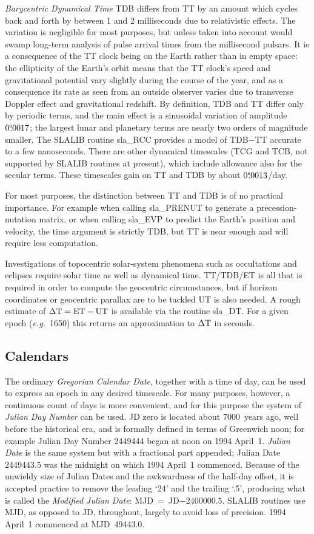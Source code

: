 \documentclass[11pt,twoside]{article}
\newcommand{\tseci}[1]   {$#1$\mbox{$^{\rm s}$}}
\newcommand{\tsec}[2]    {\tseci{#1}$\hspace{-0.3em}.#2$}
\renewcommand{\tsec}[2] {$#1^{\rm s}\hspace{-0.3em}.#2$}
\begin{document}
{\it Barycentric Dynamical Time}\/ TDB differs from TT by an amount which
cycles back and forth by between 1 and 2 milliseconds due to
relativistic effects.  The variation is
negligible for most purposes, but unless taken into
account would swamp
long-term analysis of pulse arrival times from the
millisecond pulsars.  It is a consequence of
the TT clock being on the Earth rather than in empty
space:  the ellipticity of
the Earth's orbit means that the TT clock's speed and
gravitational potential vary slightly
during the course of the year, and as a consequence
its rate as seen from an outside observer
varies due to transverse Doppler effect and gravitational
redshift.  By definition, TDB and TT differ only
by periodic terms, and the main effect
is a sinusoidal variation of amplitude \tsec{0}{0017};  the
largest lunar and planetary terms are nearly two orders of magnitude
smaller.  The SLALIB routine
sla\_RCC
provides a model of
TDB$-$TT accurate to a few nanoseconds.
There are other dynamical timescales (TCG and TCB, not supported by
SLALIB routines at present), which include allowance also for the secular terms.
These timescales gain on TT and TDB by about \tsec{0}{0013}/day.

For most purposes, the distinction between TT and TDB is
of no practical importance.  For
example when calling
sla\_PRENUT
to generate a precession-nutation matrix, or when calling
sla\_EVP
to predict the
Earth's position and velocity, the time argument is strictly
TDB, but TT is near enough and will require less computation.

Investigations of topocentric solar-system phenomena such as
occultations and eclipses require solar time as well as dynamical
time.  TT/TDB/ET is all that is required in order to compute the geocentric
circumstances, but if horizon coordinates or geocentric parallax
are to be tackled UT is also needed.  A rough estimate
of $\Delta {\rm T} = {\rm ET} - {\rm UT}$ is
available via the routine
sla\_DT.
For a given epoch ({\it e.g.}\ 1650) this returns an approximation
to $\Delta {\rm T}$ in seconds.

\subsection{Calendars}
The ordinary {\it Gregorian Calendar Date},
together with a time of day, can be
used to express an epoch in any desired timescale.  For many purposes,
however, a continuous count of days is more convenient, and for
this purpose the system of {\it Julian Day Number}\/ can be used.
JD zero is located about 7000~years ago, well before the
historical era, and is formally defined in terms of Greenwich noon;
for example Julian Day Number 2449444 began at noon
on 1994 April~1.  {\it Julian Date}\/
is the same system but with a fractional part appended;
Julian Date 2449443.5 was the midnight on which 1994 April~1
commenced.  Because of the unwieldy size of Julian Dates
and the awkwardness of the half-day offset, it is
accepted practice to remove the leading `24' and the trailing `.5',
producing what is called the {\it Modified Julian Date}:
MJD~=~JD$-2400000.5$.  SLALIB routines use MJD, as opposed to
JD, throughout, largely to avoid loss of precision.
1994 April~1 commenced at MJD~49443.0.
\end{document}
